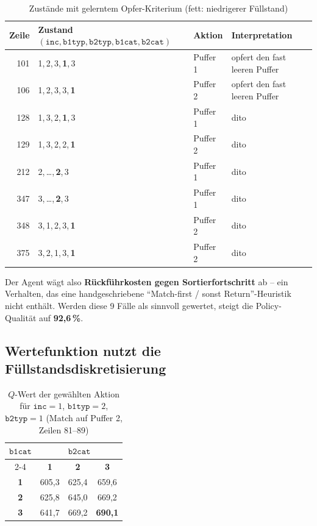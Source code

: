 \documentclass[11pt,a4paper]{article}
\newcommand{\inc}{\texttt{inc}}
\newcommand{\bit}{\texttt{b1typ}}
\newcommand{\bzt}{\texttt{b2typ}}
\newcommand{\bic}{\texttt{b1cat}}
\newcommand{\bzc}{\texttt{b2cat}}
\begin{document}
\begin{table}[htbp]
\centering
\caption{Zustände mit gelerntem Opfer-Kriterium (fett: niedrigerer Füllstand)}
\begin{tabular}{@{}rlll@{}}
\toprule
\textbf{Zeile} & \textbf{Zustand $(\inc,\bit,\bzt,\bic,\bzc)$} &
\textbf{Aktion} & \textbf{Interpretation} \\
\midrule
101 & 1,\,2,\,3,\,\textbf{1},\,3 & Puffer 1 & opfert den fast leeren Puffer \\
106 & 1,\,2,\,3,\,3,\,\textbf{1} & Puffer 2 & opfert den fast leeren Puffer \\
128 & 1,\,3,\,2,\,\textbf{1},\,3 & Puffer 1 & dito \\
129 & 1,\,3,\,2,\,2,\,\textbf{1} & Puffer 2 & dito \\
212 & 2,\,\dots,\,\textbf{2},\,3 & Puffer 1 & dito \\
347 & 3,\,\dots,\,\textbf{2},\,3 & Puffer 1 & dito \\
348 & 3,\,1,\,2,\,3,\,\textbf{1} & Puffer 2 & dito \\
375 & 3,\,2,\,1,\,3,\,\textbf{1} & Puffer 2 & dito \\
\bottomrule
\end{tabular}
\end{table}

Der Agent wägt also \textbf{Rückführkosten gegen Sortierfortschritt} ab -- ein
Verhalten, das eine handgeschriebene \enquote{Match-first / sonst Return}-Heuristik
nicht enthält. Werden diese 9 Fälle als sinnvoll gewertet, steigt die
Policy-Qualität auf \textbf{92{,}6\,\%}.

\subsection{Wertefunktion nutzt die Füllstandsdiskretisierung}

\begin{table}[htbp]
\centering
\caption{$Q$-Wert der gewählten Aktion für $\inc=1$, $\bit=2$, $\bzt=1$
         (Match auf Puffer 2, Zeilen 81--89)}
\begin{tabular}{@{}cccc@{}}
\toprule
\multirow{2}{*}{$\bic$} & \multicolumn{3}{c}{$\bzc$} \\
\cmidrule(l){2-4}
 & \textbf{1} & \textbf{2} & \textbf{3} \\
\midrule
\textbf{1} & 605{,}3 & 625{,}4 & 659{,}6 \\
\textbf{2} & 625{,}8 & 645{,}0 & 669{,}2 \\
\textbf{3} & 641{,}7 & 669{,}2 & \textbf{690{,}1} \\
\bottomrule
\end{tabular}
\end{table}
\end{document}
